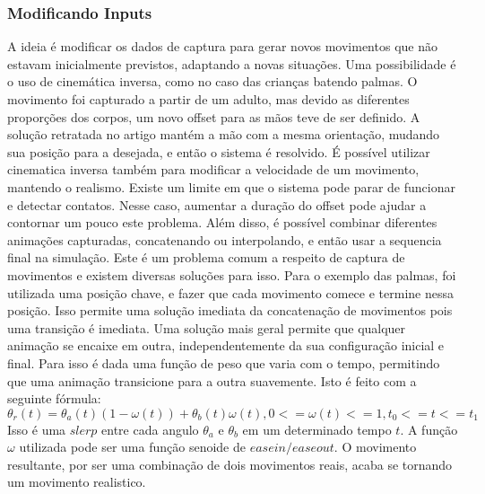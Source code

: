 \subsubsection{Modificando Inputs}
A ideia é modificar os dados de captura para gerar novos movimentos que não estavam inicialmente previstos, adaptando a novas situações. Uma possibilidade é o uso de cinemática inversa, como no caso das crianças batendo palmas. O movimento foi capturado a partir de um adulto, mas devido as diferentes proporções dos corpos, um novo offset para as mãos teve de ser definido. A solução retratada no artigo mantém a mão com a mesma orientação, mudando sua posição para a desejada, e então o sistema é resolvido. É possível utilizar cinematica inversa também para modificar a velocidade de um movimento, mantendo o realismo. Existe um limite em que o sistema pode parar de funcionar e detectar contatos. Nesse caso, aumentar a duração do offset pode ajudar a contornar um pouco este problema.
Além disso, é possível combinar diferentes animações capturadas, concatenando ou interpolando, e então usar a sequencia final na simulação. Este é um problema comum a respeito de captura de movimentos e existem diversas soluções para isso. Para o exemplo das palmas, foi utilizada uma posição chave, e fazer que cada movimento comece e termine nessa posição. Isso permite uma solução imediata da concatenação de movimentos pois uma transição é imediata. Uma solução mais geral permite que qualquer animação se encaixe em outra, independentemente da sua configuração inicial e final. Para isso é dada uma função de peso que varia com o tempo, permitindo que uma animação transicione para a outra suavemente. Isto é feito com a seguinte fórmula:
\begin{equation}
  \label{eq:1999:upperbody:calc_stiffness}
  \theta_r(t) = \theta_a(t)(1-\omega(t)) +   \theta_b(t)\omega(t), 0<=\omega(t)<=1, t_0 <= t <= t_1
\end{equation}
Isso é uma $slerp$ entre cada angulo $\theta_a$ e $\theta_b$ em um determinado tempo $t$. A função $\omega$ utilizada pode ser uma função senoide de $ease in/ease out$.
O movimento resultante, por ser uma combinação de dois movimentos reais, acaba se tornando um movimento realistico.
